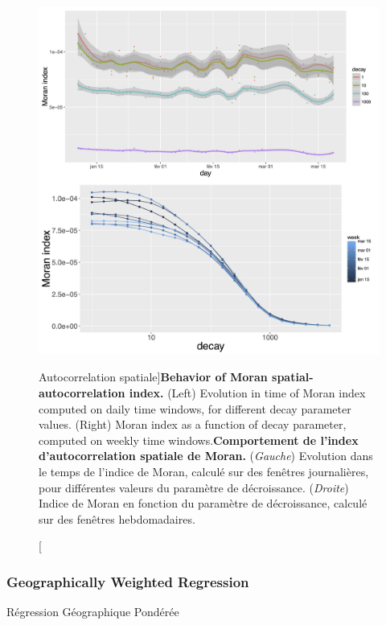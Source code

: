 \begin{figure}
\includegraphics[width=\linewidth]{Figures/Final/8-2-2-fig-energyprice-moran.jpg}
\caption[Moran spatial-autocorrelation index][Autocorrelation spatiale]{\textbf{Behavior of Moran spatial-autocorrelation index.} (Left) Evolution in time of Moran index computed on daily time windows, for different decay parameter values. (Right) Moran index as a function of decay parameter, computed on weekly time windows.\label{fig:energyprice:moran}}{\textbf{Comportement de l'index d'autocorrelation spatiale de Moran.} (\textit{Gauche}) Evolution dans le temps de l'indice de Moran, calculé sur des fenêtres journalières, pour différentes valeurs du paramètre de décroissance. (\textit{Droite}) Indice de Moran en fonction du paramètre de décroissance, calculé sur des fenêtres hebdomadaires.\label{fig:energyprice:moran}}
\end{figure}



\subsubsection{Geographically Weighted Regression}{Régression Géographique Pondérée}


